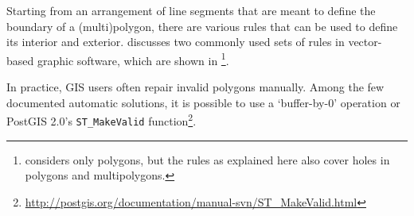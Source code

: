 Starting from an arrangement of line segments that are meant to define the boundary of a (multi)polygon, there are various rules that can be used to define its interior and exterior.
\citet{Foley95} discusses two commonly used sets of rules in vector-based graphic software, which are shown in \footnote{\citet{Foley95} considers only polygons, but the rules as explained here also cover holes in polygons and multipolygons.}.

In practice, GIS users often repair invalid polygons manually.
Among the few documented automatic solutions, it is possible to use a `buffer-by-0' operation \citep{Ramsey10} or PostGIS 2.0's \texttt{ST\_MakeValid} function\footnote{\url{http://postgis.org/documentation/manual-svn/ST_MakeValid.html}}.

